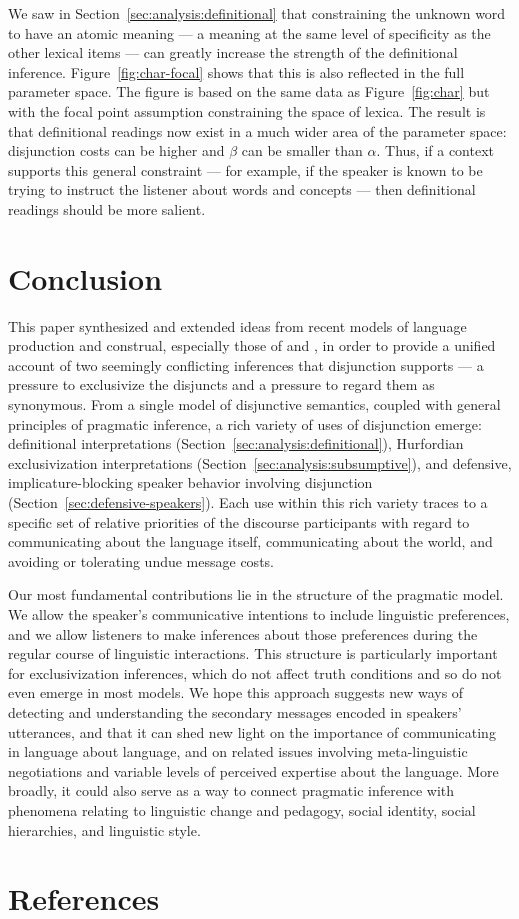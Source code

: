 \documentclass[12pt,twoside]{article}
\newcommand{\secref}[1]{Section~\ref{#1}}
\newcommand{\Figref}[1]{Figure~\ref{#1}}
\newcommand{\figref}[1]{Figure~\ref{#1}}
\renewcommand{\_}{\textbf{\textunderscore\hspace{-4pt}\textunderscore\hspace{-3pt}\textunderscore\hspace{-4pt}\textunderscore}\hspace{0.5pt}}			%
\begin{document}
We saw in \secref{sec:analysis:definitional} that constraining the
unknown word to have an atomic meaning --- a meaning at the same level
of specificity as the other lexical items --- can greatly increase the
strength of the definitional inference.  \Figref{fig:char-focal} shows
that this is also reflected in the full parameter space. The figure is
based on the same data as \figref{fig:char} but with the focal point
assumption constraining the space of lexica. The result is that
definitional readings now exist in a much wider area of the parameter
space: disjunction costs can be higher and $\beta$ can be smaller than
$\alpha$. Thus, if a context supports this general constraint --- for
example, if the speaker is known to be trying to instruct the listener
about words and concepts --- then definitional readings should be more
salient.



\section{Conclusion}\label{sec:conclusion}

This paper synthesized and extended ideas from recent models of
language production and construal, especially those of
\citet{Smith:Goodman:Frank:2013} and \citet{bergen-levy-goodman:2014},
in order to provide a unified account of two seemingly conflicting
inferences that disjunction supports --- a pressure to exclusivize the
disjuncts and a pressure to regard them as synonymous.  From a single
model of disjunctive semantics, coupled with general principles of
pragmatic inference, a rich variety of uses of disjunction emerge:
definitional interpretations (\secref{sec:analysis:definitional}),
Hurfordian exclusivization interpretations
(\secref{sec:analysis:subsumptive}), and defensive,
implicature-blocking speaker behavior involving disjunction 
(\secref{sec:defensive-speakers}).  Each use within this rich variety
traces to a specific set of relative priorities of the discourse
participants with regard to communicating about the language itself,
communicating about the world, and avoiding or tolerating undue
message costs.

Our most fundamental contributions lie in the structure of the
pragmatic model. We allow the speaker's communicative intentions to
include linguistic preferences, and we allow listeners to make
inferences about those preferences during the regular course of
linguistic interactions. This structure is particularly important for
exclusivization inferences, which do not affect truth conditions and
so do not even emerge in most models.  We hope this approach suggests
new ways of detecting and understanding the secondary messages encoded
in speakers' utterances, and that it can shed new light on the
importance of communicating in language about language, and on related
issues involving meta-linguistic negotiations and variable levels of
perceived expertise about the language. More broadly, it could also
serve as a way to connect pragmatic inference with phenomena relating
to linguistic change and pedagogy, social identity, social
hierarchies, and linguistic style.


\section{References}


\end{document}
